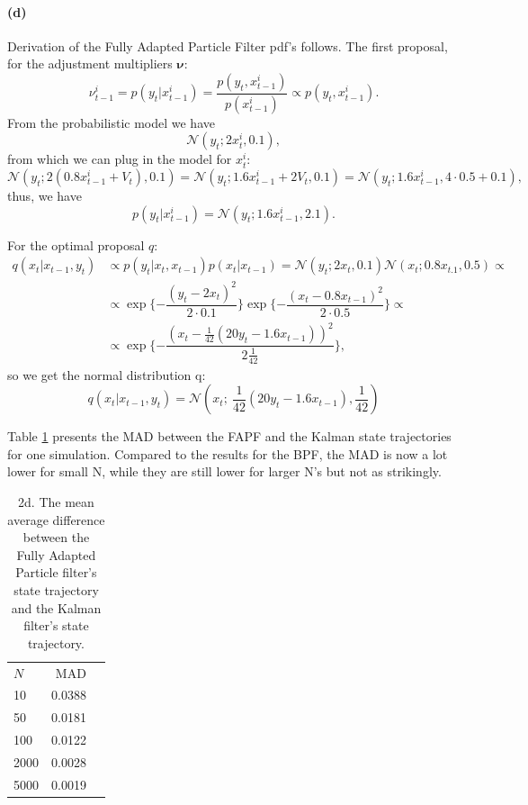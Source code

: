 \documentclass{article}
\begin{document}
\paragraph{(d)} Derivation of the Fully Adapted Particle Filter pdf's follows.
The first proposal, for the adjustment multipliers $\bm{\nu}$:
	\begin{equation}
		\nu_{t-1}^i = p(y_t|x_{t-1}^i) = \dfrac{p(y_t,x_{t-1}^i)}{p(x_{t-1}^i)} \propto p(y_t,x_{t-1}^i).
	\end{equation}
	From the probabilistic model we have 
	\begin{equation}
		\mathcal{N}(y_t; 2x_t^i,0.1),
	\end{equation}
	from which we can plug in the model for $x_t^i$:
	\begin{equation}
		\mathcal{N}(y_t; 2(0.8x_{t-1}^i+V_t),0.1) = \mathcal{N}(y_t; 1.6x_{t-1}^i + 2V_t,0.1) = \mathcal{N}(y_t; 1.6x_{t-1}^i,4\cdot 0.5 + 0.1),
	\end{equation}
	thus, we have 
	\begin{equation}
		p(y_t|x_{t-1}^i) = \mathcal{N}(y_t; 1.6x_{t-1}^i, 2.1).
	\end{equation}
	
For the optimal proposal $q$:
	\begin{align}
		q(x_t|x_{t-1}, y_t) &\propto p(y_t|x_t,x_{t-1})p(x_t|x_{t-1}) = \mathcal{N}(y_t;2x_t,0.1)\mathcal{N}(x_t; 0.8x_{t.1},0.5) \propto\\
		&\propto \exp\{-\dfrac{(y_t-2x_t)^2}{2\cdot 0.1}\}\exp\{-\dfrac{(x_t-0.8x_{t-1})^2}{2\cdot 0.5}\}\propto\\
		&\propto\exp\{-\dfrac{(x_t-\frac{1}{42}(20y_t-1.6x_{t-1}))^2}{2\frac{1}{42}}\},
	\end{align}
so we get the normal distribution q:
	\begin{equation}
		q(x_t|x_{t-1}, y_t) = \mathcal{N}(x_t;~\frac{1}{42}(20y_t-1.6x_{t-1}), \frac{1}{42})
	\end{equation}


Table \ref{tab:2d} presents the MAD between the FAPF and the Kalman state trajectories for one simulation. Compared to the results for the BPF, the MAD is now a lot lower for small N, while they are still lower for larger N's but not as strikingly. 
	\begin{table}
		\centering
		\begin{tabular}{lrr}\hline
			$N$ & MAD 		\\
			10 	& 0.0388	\\
			50	& 0.0181	\\
			100	& 0.0122	\\
			2000& 0.0028	\\
			5000& 0.0019 	\\\hline
		\end{tabular}
		\caption{2d. The mean average difference between the Fully Adapted Particle filter's state trajectory and the Kalman filter's state trajectory.}
		\label{tab:2d}
	\end{table}
\end{document}
